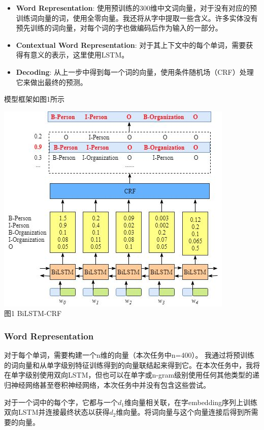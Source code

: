 \documentclass[UTF8]{article}
\begin{document}
\begin{itemize}
	\item \textbf{Word Representation}: 使用预训练的300维中文词向量，对于没有对应的预训练词向量的词，使用全零向量。我还将从字中提取一些含义。许多实体没有预先训练的词向量，对每个词的字也做编码后作为输入的一部分。
	\item \textbf{Contextual Word Representation}: 对于其上下文中的每个单词，需要获得有意义的表示，这里使用LSTM。
	\item \textbf{Decoding}: 从上一步中得到每一个词的向量，使用条件随机场（CRF）处理它来做出最终的预测。
\end{itemize}

模型框架如图1所示
\begin{center}
\includegraphics[scale=0.8]{BiLSTM-CRF.jpg} \\
图1 BiLSTM-CRF
\end{center}
\subsubsection{Word Representation}
对于每个单词，需要构建一个n维的向量（本次任务中n=400）。 我通过将预训练的词向量和从单字级别特征训练得到的向量联结起来得到它。在本次任务中，我将在单字级别使用双向LSTM，但也可以在单字或n-gram级别使用任何其他类型的递归神经网络甚至卷积神经网络，本次任务中并没有包含这些尝试。

对于一个词中的每个字，它都与一个$d_1$维向量相关联，在字embedding序列上训练双向LSTM并连接最终状态以获得$d_2$维向量。将词向量与这个向量连接后得到所需要的向量。
\end{document}

